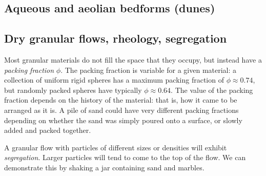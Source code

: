 \subsection{Aqueous and aeolian bedforms (dunes)}

\subsection{Dry granular flows, rheology, segregation}

Most granular materials do not fill the space that they occupy, but instead have a \textit{packing fraction} $\phi$. The packing fraction is variable for a given material: a collection of uniform rigid spheres has a maximum packing fraction of $\phi\approx0.74$, but randomly packed spheres have typically $\phi\approx0.64$. The value of the packing fraction depends on the history of the material: that is, how it came to be arranged as it is. A pile of sand could have very different packing fractions depending on whether the sand was simply poured onto a surface, or slowly added and packed together. 

A granular flow with particles of different sizes or densities will exhibit \textit{segregation}. Larger particles will tend to come to the top of the flow. We can demonstrate this by shaking a jar containing sand and marbles.




